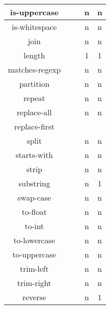 \documentclass[anonymous,sigplan,review,11pt,nonacm,natbib=false]{acmart}
\begin{document}
\begin{table*}[]
\begin{tabular}{|c||c|c|c|c|}
            is-uppercase &  &  & n & n \\ \hline

            is-whitespace &  &  & n & n \\ \hline

            join &  &  & n & n \\ \hline

            length &  &  & 1 & 1 \\ \hline

            matches-regexp &  &  & n & n \\ \hline

            partition &  &  & n & n \\ \hline

            repeat &  &  & n & n \\ \hline

            replace-all &  &  & n & n \\ \hline

            replace-first  &  &  &  & \\ \hline

            split &  &  & n & n \\ \hline

            starts-with &  &  & n & n \\ \hline

            strip &  &  & n & n \\ \hline

            substring &  &  & n & 1 \\ \hline

            swap-case &  &  & n & n \\ \hline

            to-float &  &  & n & n \\ \hline

            to-int &  &  & n & n \\ \hline

            to-lowercase &  &  & n & n \\ \hline

            to-uppercase &  &  & n & n \\ \hline

            trim-left &  &  & n & n \\ \hline

            trim-right &  &  & n & n \\ \hline

            reverse &  &  & n & 1 \\ \hline


\end{tabular}
\end{table*}
\end{document}
